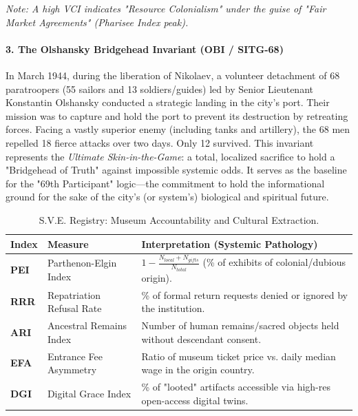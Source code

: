 \documentclass[11pt,a4paper]{article}
\theoremstyle{definition}
\theoremstyle{remark}
\begin{document}
\textit{Note: A high VCI indicates "Resource Colonialism" under the guise of "Fair Market Agreements" (Pharisee Index peak).}




\paragraph{3. The Olshansky Bridgehead Invariant (OBI / SITG-68)} 
In March 1944, during the liberation of Nikolaev, a volunteer detachment of 68 paratroopers (55 sailors and 13 soldiers/guides) led by Senior Lieutenant Konstantin Olshansky conducted a strategic landing in the city's port. Their mission was to capture and hold the port to prevent its destruction by retreating forces. Facing a vastly superior enemy (including tanks and artillery), the 68 men repelled 18 fierce attacks over two days. Only 12 survived. This invariant represents the \textit{Ultimate Skin-in-the-Game}: a total, localized sacrifice to hold a "Bridgehead of Truth" against impossible systemic odds. It serves as the baseline for the "69th Participant" logic—the commitment to hold the informational ground for the sake of the city's (or system's) biological and spiritual future.

\begin{table}[h!]
\centering
\small
\begin{tabular}{|l|l|l|}
\hline
\textbf{Index} & \textbf{Measure} & \textbf{Interpretation (Systemic Pathology)} \\ \hline
\textbf{PEI} & Parthenon-Elgin Index & $1 - \frac{N_{local} + N_{gifts}}{N_{total}}$ (\% of exhibits of colonial/dubious origin). \\ \hline
\textbf{RRR} & Repatriation Refusal Rate & \% of formal return requests denied or ignored by the institution. \\ \hline
\textbf{ARI} & Ancestral Remains Index & Number of human remains/sacred objects held without descendant consent. \\ \hline
\textbf{EFA} & Entrance Fee Asymmetry & Ratio of museum ticket price vs. daily median wage in the origin country. \\ \hline
\textbf{DGI} & Digital Grace Index & \% of "looted" artifacts accessible via high-res open-access digital twins. \\ \hline
\end{tabular}
\caption{S.V.E. Registry: Museum Accountability and Cultural Extraction.}
\end{table}
\end{document}
